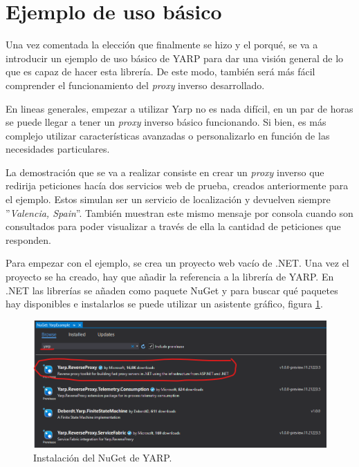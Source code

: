 \documentclass[11pt,spanish,listoffigures]{tfgetsinf}
\begin{document}

	\section{Ejemplo de uso básico} \label{ejemploUsoYARP}

Una vez comentada la elección que finalmente se hizo y el porqué, se va a introducir un ejemplo de uso básico de YARP para dar una visión general de lo que es capaz de hacer esta librería. De este modo, también será más fácil comprender el funcionamiento del \emph{proxy} inverso desarrollado.

En lineas generales, empezar a utilizar Yarp no es nada difícil, en un par de horas se puede llegar a tener un \emph{proxy} inverso básico funcionando. Si bien, es más complejo utilizar características avanzadas o personalizarlo en función de las necesidades particulares.

La demostración que se va a realizar consiste en crear un \emph{proxy} inverso que redirija peticiones hacía dos servicios web de prueba, creados anteriormente para el ejemplo. Estos simulan ser un servicio de localización y devuelven siempre ''\emph{Valencia, Spain}''. También muestran este mismo mensaje por consola cuando son consultados para poder visualizar a través de ella la cantidad de peticiones que responden.

Para empezar con el ejemplo, se crea un proyecto web vacío de .NET. Una vez el proyecto se ha creado, hay que añadir la referencia a la librería de YARP. En .NET las librerías se añaden como paquete NuGet \cite{NuGet} y para buscar qué paquetes hay disponibles e instalarlos se puede utilizar un asistente gráfico, figura \ref{ejemploYARP_instalacionNuGet}.

\begin{figure}[ht]
\centering
\includegraphics[width=1\textwidth]{imagenes/ejemploYARP/instalacionNuGet}
\caption{Instalación del NuGet de YARP.}
	\label{ejemploYARP_instalacionNuGet}
\end{figure}
\end{document}
